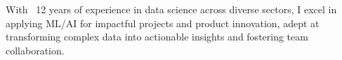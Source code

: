 With ~12 years of experience in data science across diverse sectors, I excel in applying ML/AI for impactful projects and product innovation, adept at transforming complex data into actionable insights and fostering team collaboration.
